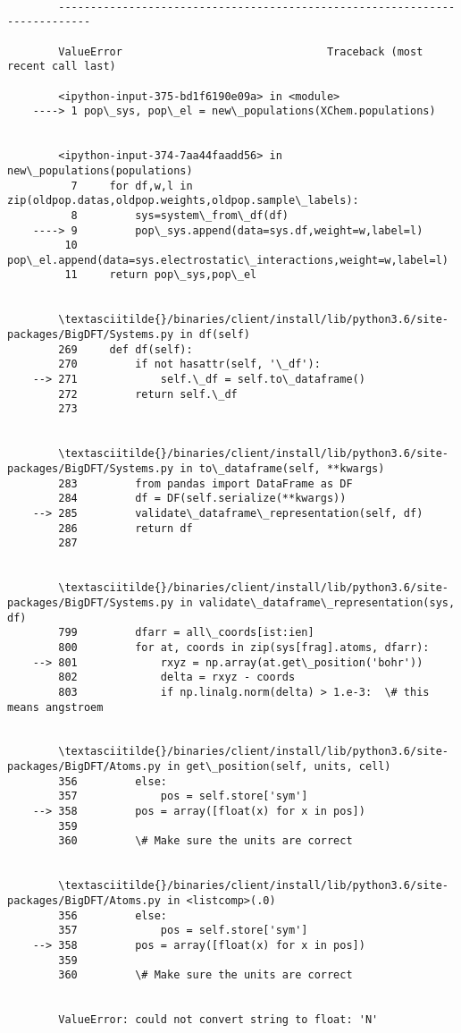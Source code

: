 \documentclass[11pt]{article}
\begin{document}
    \begin{Verbatim}[commandchars=\\\{\}]

        ---------------------------------------------------------------------------

        ValueError                                Traceback (most recent call last)

        <ipython-input-375-bd1f6190e09a> in <module>
    ----> 1 pop\_sys, pop\_el = new\_populations(XChem.populations)
    

        <ipython-input-374-7aa44faadd56> in new\_populations(populations)
          7     for df,w,l in zip(oldpop.datas,oldpop.weights,oldpop.sample\_labels):
          8         sys=system\_from\_df(df)
    ----> 9         pop\_sys.append(data=sys.df,weight=w,label=l)
         10         pop\_el.append(data=sys.electrostatic\_interactions,weight=w,label=l)
         11     return pop\_sys,pop\_el


        \textasciitilde{}/binaries/client/install/lib/python3.6/site-packages/BigDFT/Systems.py in df(self)
        269     def df(self):
        270         if not hasattr(self, '\_df'):
    --> 271             self.\_df = self.to\_dataframe()
        272         return self.\_df
        273 


        \textasciitilde{}/binaries/client/install/lib/python3.6/site-packages/BigDFT/Systems.py in to\_dataframe(self, **kwargs)
        283         from pandas import DataFrame as DF
        284         df = DF(self.serialize(**kwargs))
    --> 285         validate\_dataframe\_representation(self, df)
        286         return df
        287 


        \textasciitilde{}/binaries/client/install/lib/python3.6/site-packages/BigDFT/Systems.py in validate\_dataframe\_representation(sys, df)
        799         dfarr = all\_coords[ist:ien]
        800         for at, coords in zip(sys[frag].atoms, dfarr):
    --> 801             rxyz = np.array(at.get\_position('bohr'))
        802             delta = rxyz - coords
        803             if np.linalg.norm(delta) > 1.e-3:  \# this means angstroem


        \textasciitilde{}/binaries/client/install/lib/python3.6/site-packages/BigDFT/Atoms.py in get\_position(self, units, cell)
        356         else:
        357             pos = self.store['sym']
    --> 358         pos = array([float(x) for x in pos])
        359 
        360         \# Make sure the units are correct


        \textasciitilde{}/binaries/client/install/lib/python3.6/site-packages/BigDFT/Atoms.py in <listcomp>(.0)
        356         else:
        357             pos = self.store['sym']
    --> 358         pos = array([float(x) for x in pos])
        359 
        360         \# Make sure the units are correct


        ValueError: could not convert string to float: 'N'

    \end{Verbatim}
\end{document}
